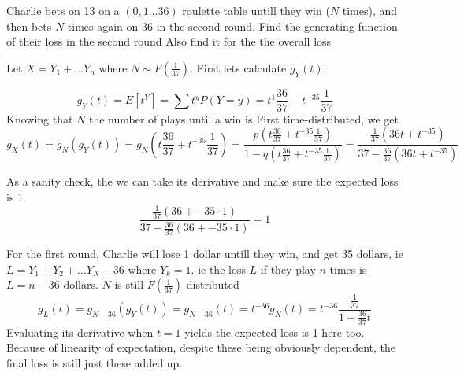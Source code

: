 \begin{enumerate}[label=(\alph*)]
\exercise
Charlie bets on 13 on a $(0,1...36)$ roulette table untill they win ($N$ times), and then bets $N$ times again on 36 in the second round. Find the generating function of their loss in the second round
Also find it for the the overall loss

\solution
Let \(X = Y_1 + ... Y_n\) where $N \sim F(\frac{1}{37})$. First lets calculate $g_Y(t)$:


\[
    g_Y(t) = E[t^Y] = \sum t^y P(Y=y) = t^1 \frac{36}{37} + t^{-35} \frac{1}{37}
\]
Knowing that $N$ the number of plays until a win is First time-distributed, we get
\[
    g_X(t) = g_N(g_Y(t)) = g_N(t \frac{36}{37} + t^{-35} \frac{1}{37}) = \frac{p(t \frac{36}{37} + t^{-35} \frac{1}{37})}{1-q(t \frac{36}{37} + t^{-35} \frac{1}{37})} = \frac{\frac{1}{37}(36t + t^{-35} )}{37-\frac{36}{37}(36t + t^{-35} )}
     \]

As a sanity check, the we can take its derivative and make sure the expected loss is 1.
\[ 
    \frac{\frac{1}{37}(36 + -35 \cdot 1 )}{37-\frac{36}{37}(36 + -35 \cdot 1)} = 1
\]

For the first round, Charlie will lose 1 dollar untill they win, and get 35 dollars, ie $L = Y_1 + Y_2 +... Y_N -36$ where $Y_k = 1$. ie the loss $L$ if they play $n$ times is $L = n-36$ dollars. $N$ is still $F(\frac{1}{37})$-distributed
\[
    g_L(t) = g_{N-36}(g_Y(t)) = g_{N-36}(t) = t^{-36}g_N(t) = t^{-36} \frac{\frac{1}{37}}{1 -\frac{36}{37}t}
\]
Evaluating its derivative when $t=1$ yields the expected loss is 1 here too. Because of linearity of expectation, despite these being obviously dependent, the final loss is still just these added up.
\vspace*{100pt}

\end{enumerate}

